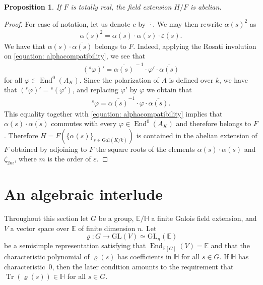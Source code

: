 \documentclass[oneside]{amsart}
\newtheorem{proposition}[theorem]{Proposition}
\theoremstyle{remark}
\newcommand{\Gal}{\mathrm{Gal}}
\newcommand{\GL}{\mathrm{GL}}
\newcommand{\End}{\operatorname{End}}
\newcommand{\Tr}{\operatorname{Tr}}
\newcommand{\Hg}{\mathbb{H}}
\newcommand{\Eg}{\mathbb{E}}
\numberwithin{equation}{section}
\begin{document}
\begin{proposition}\label{prop:H/F abelian}
  If $F$ is totally real, the field extension $H/F$ is abelian.
\end{proposition}
\begin{proof}
For ease of notation, let us denote $c$ by $\overline \cdot$. We may then rewrite $\alpha(s)^2$ as
  \begin{align*}
    \alpha(s)^2 = \alpha(s)\cdot \overline{\alpha(s)}\cdot \varepsilon(s).
  \end{align*}
 We have that $\alpha(s)\cdot \overline{\alpha(s)} $ belongs to $F$. Indeed, applying the Rosati involution on \eqref{equation: alphacompatibility}, we see that
  \begin{align*}
    ({}^s \varphi)' = \overline{\alpha(s)}^{\, -1}\cdot \varphi'\cdot \overline{\alpha(s)}  
  \end{align*}
  for all $\varphi\in \End^0(A_K)$. Since the polarization of $A$ is defined over $k$, we have that $({}^s \varphi)' = {}^s (\varphi')$, and replacing $\varphi'$ by $\varphi$ we obtain that
  \begin{align*}
    {}^s \varphi = \overline{\alpha(s)}^{-1}\cdot \varphi\cdot \overline{\alpha(s)}.  
  \end{align*}
  This equality together with \eqref{equation: alphacompatibility} implies that $\alpha(s)\cdot \overline{\alpha(s)}$ commutes with every $\varphi\in \End^0(A_K)$ and therefore belongs to $F$.
  Therefore $H = F(\{\alpha(s)\}_{s \in \Gal(K/k)})$ is contained in the abelian extension of $F$ obtained by adjoining to $F$ the square roots of the elements $\alpha(s)\cdot \overline{\alpha(s)} $ and $\zeta_{2m}$, where $m$ is the order of $\varepsilon$.
\end{proof}

\section{An algebraic interlude}

Throughout this section let $G$ be a group, $\Eg/\Hg$ a finite Galois field extension, and $V$ a vector space over $\Eg$ of finite dimension $n$. Let
$$
\varrho:G\rightarrow \GL(V)\simeq \GL_n(\Eg)
$$
be a semisimple representation satisfying that $\End_{\Eg[G]}(V)=\Eg$ and that the characteristic polynomial of $\varrho(s)$ has coefficients in $\Hg$ for all $s\in G$. If $\Hg$ has characteristic~0, then the later condition amounts to the requirement that $\Tr(\varrho(s))\in \Hg$ for all $s\in G$.
\end{document}
